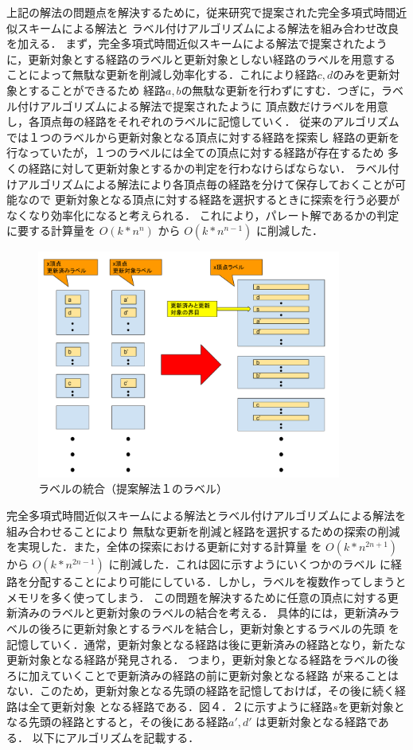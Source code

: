 \documentclass[12pt]{optlab-bachelor}
\begin{document}
上記の解法の問題点を解決するために，従来研究で提案された完全多項式時間近似スキームによる解法と
ラベル付けアルゴリズムによる解法を組み合わせ改良を加える．
まず，完全多項式時間近似スキームによる解法で提案されたように，更新対象とする経路のラベルと更新対象としない経路のラベルを用意する
ことによって無駄な更新を削減し効率化する．これにより経路$c,d$のみを更新対象とすることができるため
経路$a,b$の無駄な更新を行わずにすむ．つぎに，ラベル付けアルゴリズムによる解法で提案されたように
頂点数だけラベルを用意し，各頂点毎の経路をそれぞれのラベルに記憶していく．
従来のアルゴリズムでは１つのラベルから更新対象となる頂点に対する経路を探索し
経路の更新を行なっていたが，１つのラベルには全ての頂点に対する経路が存在するため
多くの経路に対して更新対象とするかの判定を行わなけらばならない．
ラベル付けアルゴリズムによる解法により各頂点毎の経路を分けて保存しておくことが可能なので
更新対象となる頂点に対する経路を選択するときに探索を行う必要がなくなり効率化になると考えられる．
これにより，パレート解であるかの判定に要する計算量を $O(k*n^n)$ から $O(k*n^{n-1})$ に削減した．


\begin{figure}[htbp]
  \centering
  \caption{ラベルの統合（提案解法１のラベル）}
  \includegraphics[width=10.0cm]{fig/fig4.pdf}
\end{figure}

完全多項式時間近似スキームによる解法とラベル付けアルゴリズムによる解法を組み合わせることにより
無駄な更新を削減と経路を選択するための探索の削減を実現した．また，全体の探索における更新に対する計算量
を $O(k*n^{2n+1})$ から $O(k*n^{2n-1})$ に削減した．これは図に示すようにいくつかのラベル
に経路を分配することにより可能にしている．しかし，ラベルを複数作ってしまうとメモリを多く使ってしまう．
この問題を解決するために任意の頂点に対する更新済みのラベルと更新対象のラベルの結合を考える．
具体的には，更新済みラベルの後ろに更新対象とするラベルを結合し，更新対象とするラベルの先頭
を記憶していく．通常，更新対象となる経路は後に更新済みの経路となり，新たな更新対象となる経路が発見される．
つまり，更新対象となる経路をラベルの後ろに加えていくことで更新済みの経路の前に更新対象となる経路
が来ることはない．このため，更新対象となる先頭の経路を記憶しておけば，その後に続く経路は全て更新対象
となる経路である．図４．２に示すように経路$s$を更新対象となる先頭の経路とすると，その後にある経路$a',d'$
は更新対象となる経路である．
以下にアルゴリズムを記載する．
\end{document}
